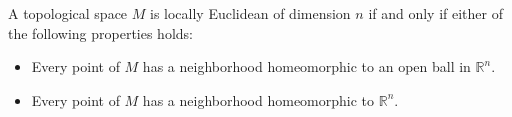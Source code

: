 \documentclass{mathnotes}
\begin{document}
\begin{lem}
    A topological space $M$ is locally Euclidean of dimension $n$ if and only if either of the following properties holds:
    \begin{itemize}
        \item Every point of $M$ has a neighborhood homeomorphic to an open ball in $\mathbb{R}^n$.
        \item Every point of $M$ has a neighborhood homeomorphic to $\mathbb{R}^n$.
    \end{itemize}
\end{lem}
\end{document}
